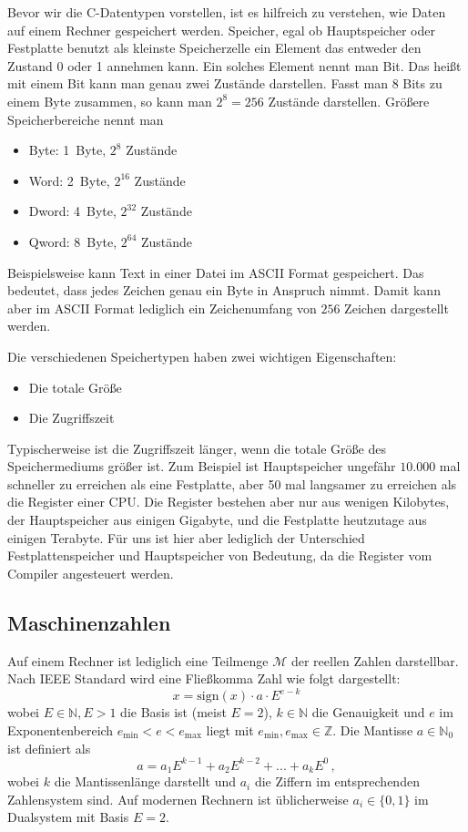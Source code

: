 Bevor wir die C-Datentypen vorstellen, ist es hilfreich zu verstehen, wie Daten auf einem Rechner gespeichert werden.
Speicher, egal ob Hauptspeicher oder Festplatte benutzt als kleinste Speicherzelle ein Element das entweder den Zustand 0 oder 1 annehmen kann.
Ein solches Element nennt man Bit.
Das heißt mit einem Bit kann man genau zwei Zustände darstellen.
Fasst man 8 Bits zu einem Byte zusammen, so kann man $2^8=256$ Zustände darstellen.
Größere Speicherbereiche nennt man
\begin{itemize}
\item Byte:  1~Byte, $2^{8 }$ Zustände
\item Word:  2~Byte, $2^{16}$ Zustände
\item Dword: 4~Byte, $2^{32}$ Zustände
\item Qword: 8~Byte, $2^{64}$ Zustände
\end{itemize}
Beispielsweise kann Text in einer Datei im ASCII Format gespeichert. 
Das bedeutet, dass jedes Zeichen genau ein Byte in Anspruch nimmt.
Damit kann aber im ASCII Format lediglich ein Zeichenumfang von $256$ Zeichen dargestellt werden.

Die verschiedenen Speichertypen haben zwei wichtigen Eigenschaften:
\begin{itemize}
\item Die totale Größe
\item Die Zugriffszeit
\end{itemize}
Typischerweise ist die Zugriffszeit länger, wenn die totale Größe des Speichermediums größer ist.
Zum Beispiel ist Hauptspeicher ungefähr $10.000$ mal schneller zu erreichen als eine Festplatte, aber 50 mal langsamer zu erreichen als die Register einer CPU.
Die Register bestehen aber nur aus wenigen Kilobytes, der Hauptspeicher aus einigen Gigabyte, und die Festplatte heutzutage aus einigen Terabyte.
Für uns ist hier aber lediglich der Unterschied Festplattenspeicher und Hauptspeicher von Bedeutung, da die Register vom Compiler angesteuert werden.

\subsection{Maschinenzahlen}

Auf einem Rechner ist lediglich eine Teilmenge $\mathcal{M}$ der
reellen Zahlen darstellbar. Nach IEEE Standard wird eine Fließkomma
Zahl wie folgt dargestellt:
\begin{equation}
x = \mathrm{sign}(x)\cdot a\cdot E^{e-k}
\end{equation}
wobei $E\in \mathbb{N}, E>1$ die Basis ist (meist $E=2$), $k\in
\mathbb{N}$ die 
Genauigkeit und $e$ im Exponentenbereich
$e_\mathrm{min}<e<e_\mathrm{max}$ liegt mit
$e_\mathrm{min},e_\mathrm{max}\in \mathbb{Z}$. Die Mantisse $a\in
\mathbb{N}_0$ ist 
definiert als
\begin{equation}
a = a_1 E^{k-1} + a_2 E^{k-2} + ... + a_k E^0\,,
\end{equation}
wobei $k$ die Mantissenlänge darstellt und $a_i$ die Ziffern im
entsprechenden Zahlensystem sind. Auf modernen Rechnern ist
üblicherweise $a_i\in\{0,1\}$ im Dualsystem mit Basis $E=2$.

